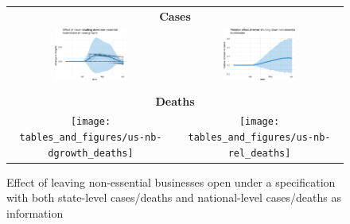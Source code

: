 \documentclass[11pt,reqno,letter]{amsart}
\theoremstyle{definition}
\begin{document}
\begin{figure}[ht]
  \caption{Effect of leaving non-essential businesses open      under a specification with both
  state-level cases/deaths and national-level cases/deaths as information \label{fig:US-nb-SI}}
  \begin{minipage}{\linewidth}
    \centering
    \begin{tabular}{cc}
      \multicolumn{2}{c}{\textbf{Cases}} \\
      \includegraphics[width=0.45\textwidth]{tables_and_figures/us-nb-dgrowth}
      &
        \includegraphics[width=0.45\textwidth]{tables_and_figures/us-nb-rel}
      \\
      \\
      \multicolumn{2}{c}{\textbf{Deaths}} \\
      \texttt{[image: tables\_and\_figures/us-nb-dgrowth\_deaths]}
      &
        \texttt{[image: tables\_and\_figures/us-nb-rel\_deaths]}
    \end{tabular}
  \end{minipage}
\end{figure}
\end{document}
